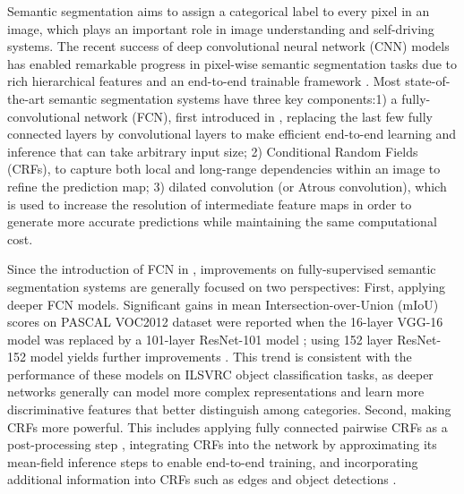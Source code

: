 \documentclass[10pt,twocolumn,letterpaper]{article}
\begin{document}
Semantic segmentation aims to assign a categorical label to every pixel in an image, which plays an important role in image understanding and self-driving systems. The recent success of deep convolutional neural network (CNN) models \cite{krizhevsky2012imagenet,simonyan2014very,he2015deep} has enabled remarkable progress in pixel-wise semantic segmentation tasks due to rich hierarchical features and an end-to-end trainable framework \cite{long2015fully,zheng2015conditional,yu2015multi,liu2015semantic,lin2015efficient,chen2016deeplab}. Most state-of-the-art semantic segmentation systems have three key components:1) a fully-convolutional network (FCN), first introduced in \cite{long2015fully}, replacing the last few fully connected layers by convolutional layers to make efficient end-to-end learning and inference that can take arbitrary input size; 2) Conditional Random Fields (CRFs), to capture both local and long-range dependencies within an image to refine the prediction map; 3) dilated convolution (or Atrous convolution), which is used to increase the resolution of intermediate feature maps in order to generate more accurate predictions while maintaining the same computational cost.

Since the introduction of FCN in \cite{long2015fully}, improvements on fully-supervised semantic segmentation systems are generally focused on two perspectives: First, applying deeper FCN models. Significant gains in mean Intersection-over-Union (mIoU) scores on PASCAL VOC2012 dataset \cite{pascal-voc-2012} were reported when the 16-layer VGG-16 model \cite{simonyan2014very} was replaced by a 101-layer ResNet-101 \cite{he2015deep} model \cite{chen2016deeplab}; using 152 layer ResNet-152 model yields further improvements \cite{wu2016high}. This trend is consistent with the performance of these models on ILSVRC \cite{russakovsky2015imagenet} object classification tasks, as deeper networks generally can model more complex representations and learn more discriminative features that better distinguish among categories. Second, making CRFs more powerful. This includes applying fully connected pairwise CRFs \cite{koltun2011efficient} as a post-processing step \cite{chen2016deeplab}, integrating CRFs into the network by approximating its mean-field inference steps \cite{zheng2015conditional,liu2015semantic,lin2015efficient} to enable end-to-end training, and incorporating additional information into CRFs such as edges \cite{kokkinos2015pushing} and object detections \cite{arnab2015higher}.
\end{document}
